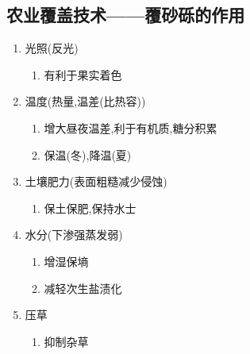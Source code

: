 \documentclass[a4paper]{article}
\begin{document}
    \subsection{农业覆盖技术——覆砂砾的作用}
    \begin{enumerate}
        \item 光照(反光)
        \begin{enumerate}
            \item 有利于果实着色
        \end{enumerate}
        \item 温度(热量,温差(比热容))
        \begin{enumerate}
            \item 增大昼夜温差,利于有机质,糖分积累
            \item 保温(冬),降温(夏)
        \end{enumerate}
        \item 土壤肥力(表面粗糙减少侵蚀)
        \begin{enumerate}
            \item 保土保肥,保持水士
        \end{enumerate}
        \item 水分(下渗强蒸发弱)
        \begin{enumerate}
            \item 增湿保墒
            \item 减轻次生盐渍化
        \end{enumerate}
        \item 压草
        \begin{enumerate}
            \item 抑制杂草
        \end{enumerate}
    \end{enumerate}
\end{document}
